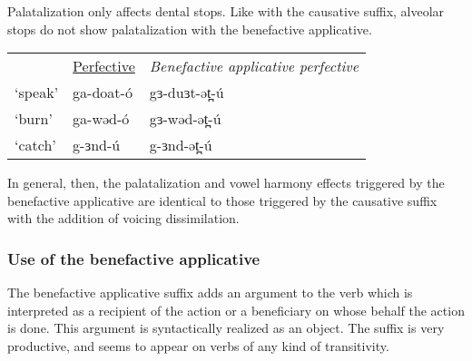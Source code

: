 Palatalization only affects dental stops. Like with the causative suffix, alveolar stops do not show palatalization with the benefactive applicative. 
\ea
\begin{tabular}[t]{lll}
&	\underline{Perfective}	&	\textit{Benefactive applicative perfective}\\
‘speak’	&	ga-doat-ó	&	gɜ-duɜt-ət̪-ú\\
‘burn’	&	ga-wəd-ó	&	gɜ-wəd-ət̪-ú\\
‘catch’	&	g-ɜnd-ú	&	g-ɜnd-ət̪-ú\\
\end{tabular}
\z

In general, then, the palatalization and vowel harmony effects triggered by the benefactive applicative are identical to those triggered by the causative suffix with the addition of voicing dissimilation.

%
%

\subsubsection{Use of the benefactive applicative}

The benefactive applicative suffix adds an argument to the verb which is interpreted as a recipient of the action or a beneficiary on whose behalf the action is done. This argument is syntactically realized as an object. The suffix is very productive, and seems to appear on verbs of any kind of transitivity.

